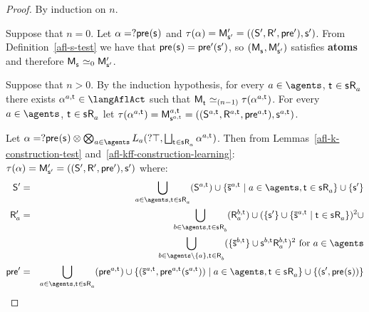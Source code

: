 \begin{proof}
    By induction on $n$.

    Suppose that $n = 0$. 
    Let $\alpha = \test{\aPrecondition(\aStateS)}$ and $\tau(\alpha) = \aPModel[\prime]{\aStateS[\prime]} = \aPModelTuple[\prime]{\aStateS[\prime]}$. 
    From Definition~\ref{afl-s-test} we have that $\aPrecondition(\aStateS) = \aPrecondition[\prime](\aStateS[\prime])$, so $(\aPModel{\aStateS}, \aPModel[\prime]{\aStateS[\prime]})$ satisfies {\bf atoms} and therefore $\aPModel{\aStateS} \bisimilar[0] \aPModel[\prime]{\aStateS[\prime]}$.

    Suppose that $n > 0$. 
    By the induction hypothesis, for every $\agentA \in \agents$, $\aStateT \in \aStateS \aAccessibility{\agentA}$ there exists $\alpha^{\agentA,\aStateT} \in \langAflAct$ such that 
    $\aPModel{\aStateT} \bisimilar[(n - 1)] \tau(\alpha^{\agentA,\aStateT})$. 
    For every $\agentA \in \agents$, $\aStateT \in \aStateS \aAccessibility{\agentA}$ let $\tau(\alpha^{\agentA,\aStateT}) = \aPModel[\agentA,\aStateT]{\aStateS[\agentA,\aStateT]} = \aPModelTuple[\agentA,\aStateT]{\aStateS[\agentA,\aStateT]}$.
    
    Let $\alpha = \test{\aPrecondition(\aStateS)} \compose \bigcompose_{\agentA \in \agents} \learns_\agentA (\test{\top}, \bigchoice_{\aStateT \in \aStateS \aAccessibility{\agentA}} \alpha^{\agentA,\aStateT})$.
    Then from Lemmas~\ref{afl-k-construction-test} and~\ref{afl-kff-construction-learning}: $\tau(\alpha) = \aPModel[\prime]{\aStateS[\prime]} =\aPModelTuple[\prime]{\aStateS[\prime]}$ where:
    \begin{eqnarray*}
        \aStates[\prime] &=& \bigcup_{\agentA \in \agents, \aStateT \in \aStateS \aAccessibility{\agentA}} (\aStates[\agentA,\aStateT]) \cup \{\aPStateS[\agentA,\aStateT] \mid \agentA \in \agents, \aStateT \in \aStateS \aAccessibility{\agentA}\} \cup \{\aStateS[\prime]\}\\
        \aAccessibility[\prime]{\agentA} &=& \bigcup_{\agentB \in \agents, \aStateT \in \aStateS \aAccessibility{\agentB}} (\aAccessibility[\agentB,\aStateT]{\agentA}) \cup (\{\aStateS[\prime]\} \cup \{\aPStateS[\agentA,\aStateT] \mid \aStateT \in \aStateS \aAccessibility{\agentA}\})^2 \cup\\&&\quad\bigcup_{\agentB \in \agents \setminus \{\agentA\}, \aStateT \in \aAccessibility{\agentB}} (\{\aPStateS[\agentB,\aStateT]\} \cup \aStateS[\agentB,\aStateT] \aAccessibility[\agentB,\aStateT]{\agentA})^2 \text{ for } \agentA \in \agents\\
        \aPrecondition[\prime] &=& \bigcup_{\agentA \in \agents, \aStateT \in \aStateS \aAccessibility{\agentA}} (\aPrecondition[\agentA,\aStateT]) \cup \{(\aPStateS[\agentA,\aStateT], \aPrecondition[\agentA,\aStateT](\aStateS[\agentA,\aStateT])) \mid \agentA \in \agents, \aStateT \in \aStateS \aAccessibility{\agentA}\} \cup \{(\aStateS[\prime], \aPrecondition(\aStateS))\}
    \end{eqnarray*}


\end{proof}
